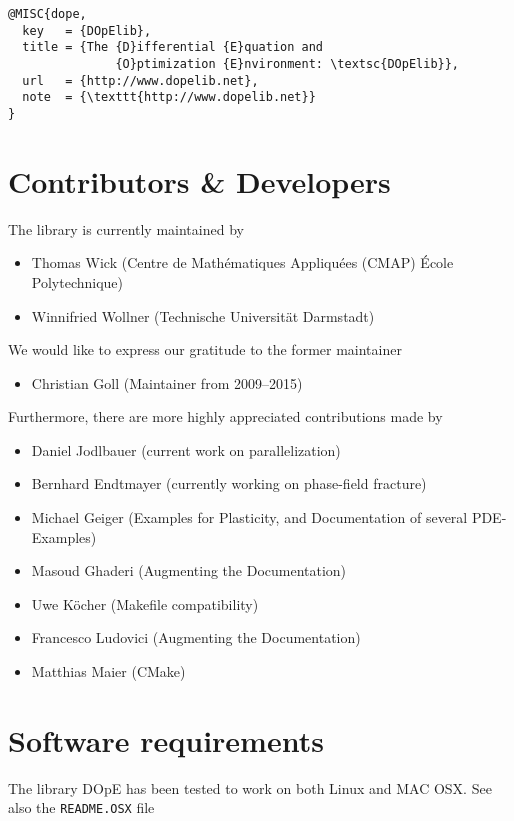 \begin{lstlisting}
@MISC{dope,
  key   = {DOpElib},
  title = {The {D}ifferential {E}quation and 
               {O}ptimization {E}nvironment: \textsc{DOpElib}},
  url   = {http://www.dopelib.net},
  note  = {\texttt{http://www.dopelib.net}}
}
\end{lstlisting}


\section{Contributors \& Developers}
\label{sec:contrib}
The library is currently maintained by 
\begin{itemize}
  \item Thomas Wick (Centre de Mathématiques Appliquées (CMAP) École Polytechnique)
  \item Winnifried Wollner (Technische Universität Darmstadt)
\end{itemize}

We would like to express our gratitude to the former maintainer
\begin{itemize}
\item Christian Goll (Maintainer from 2009--2015)
\end{itemize}

Furthermore, there are more highly appreciated contributions
made by %
\begin{itemize}
  \item Daniel Jodlbauer (current work on parallelization)
  \item Bernhard Endtmayer (currently working on phase-field fracture)
  \item Michael Geiger (Examples for Plasticity, and Documentation of several PDE-Examples)
  \item Masoud Ghaderi (Augmenting the Documentation)
  \item Uwe K{\"o}cher (Makefile compatibility)
  \item Francesco Ludovici (Augmenting the Documentation)
  \item Matthias Maier (CMake)
\end{itemize}


\section{Software requirements}
The library DOpE has been tested to work on both Linux and 
MAC OSX. See also the \texttt{README.OSX} file 

